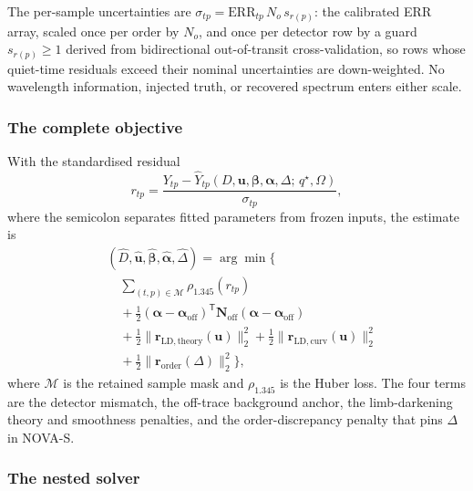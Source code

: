 The per-sample uncertainties are
$\sigma_{tp}=\mathrm{ERR}_{tp}\,N_o\,s_{r(p)}$: the calibrated ERR array,
scaled once per order by $N_o$, and once per detector row by a guard
$s_{r(p)}\geq 1$ derived from bidirectional out-of-transit
cross-validation, so rows whose quiet-time residuals exceed their nominal
uncertainties are down-weighted. No wavelength information, injected
truth, or recovered spectrum enters either scale.

\subsubsection{The complete objective}


With the standardised residual
\begin{equation}
 r_{tp}=\frac{Y_{tp}-\widehat Y_{tp}
 (D,\bm{u},\bm{\beta},\bm{\alpha},\Delta;\,q^\star,\Omega)}{\sigma_{tp}},
 \label{eq:residual}
\end{equation}
where the semicolon separates fitted parameters from frozen inputs, the
estimate is
\begin{equation}
\begin{split}
 &(\widehat D,\widehat{\bm{u}},\widehat{\bm{\beta}},
  \widehat{\bm{\alpha}},\widehat\Delta)
 = \arg\min\Big\{ \\
 &\quad\sum_{(t,p)\in\mathcal{M}}\rho_{1.345}(r_{tp}) \\
 &\quad+\tfrac{1}{2}(\bm{\alpha}-\bm{\alpha}_{\mathrm{off}})^{\mathsf T}
   \bm{N}_{\mathrm{off}}(\bm{\alpha}-\bm{\alpha}_{\mathrm{off}}) \\
 &\quad+\tfrac{1}{2}\|\bm{r}_{\mathrm{LD,theory}}(\bm{u})\|_2^2
  +\tfrac{1}{2}\|\bm{r}_{\mathrm{LD,curv}}(\bm{u})\|_2^2 \\
 &\quad+\tfrac{1}{2}\|\bm{r}_{\mathrm{order}}(\Delta)\|_2^2
 \Big\},
\end{split}
 \label{eq:objective}
\end{equation}
where $\mathcal{M}$ is the retained sample mask and $\rho_{1.345}$ is the
Huber loss. The four terms are the detector mismatch, the off-trace
background anchor, the limb-darkening theory and smoothness penalties, and
the order-discrepancy penalty that pins $\Delta$ in NOVA-S.

\subsubsection{The nested solver}

